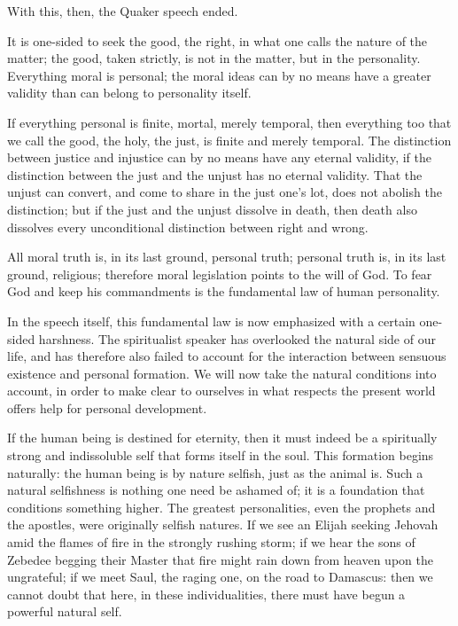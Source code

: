 \documentclass[12pt,a4paper]{book}
\begin{document}
With this, then, the Quaker speech ended.

It is one-sided to seek the good, the right, in what one calls the nature of the matter; the good, taken strictly, is not in the matter, but in the personality. Everything moral is
personal; the moral ideas can by no means have a greater validity than can belong to personality itself.

If everything personal is finite, mortal, merely temporal, then everything too that we call the good, the holy, the just, is finite and merely temporal. The distinction between justice and injustice can by no means have any eternal validity, if the distinction between the just and the unjust has no eternal validity. That the unjust can convert, and come to share in the just one's lot, does not abolish the distinction; but if the just and the unjust dissolve in death, then death also dissolves every unconditional distinction between right and wrong.

All moral truth is, in its last ground, personal truth; personal truth is, in its last ground, religious; therefore moral legislation points to the will of God. To fear God and keep his commandments is the fundamental law of human personality.

In the speech itself, this fundamental law is now emphasized with a certain one-sided harshness. The spiritualist speaker has overlooked the natural side of our life, and has therefore also failed to account for the interaction between sensuous existence and personal formation. We will now take the natural conditions into account, in order to make clear to ourselves in what respects the present world offers help for personal development.

If the human being is destined for eternity, then it must indeed be a spiritually strong and indissoluble self that forms itself in the soul. This formation begins naturally: the human being is by nature selfish, just as the animal is. Such a natural selfishness is nothing one need be ashamed of; it is a foundation that conditions something higher. The greatest personalities, even the prophets and the apostles, were originally selfish natures. If we see an Elijah seeking Jehovah amid the flames of fire in the strongly rushing storm; if we hear the sons of Zebedee begging their Master that fire might rain down from heaven upon the ungrateful; if we meet Saul, the raging one, on the road to
Damascus: then we cannot doubt that here, in these individualities, there must have begun a powerful natural self.
\end{document}
